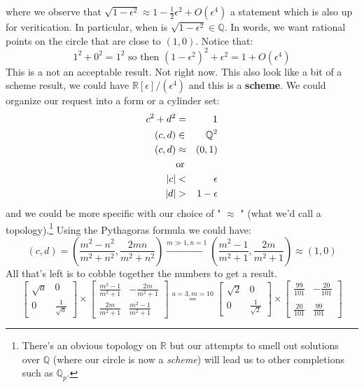 \documentclass[12pt]{article}
\begin{document}
where we observe that $\sqrt{1-\epsilon^2} \approx 1 - \frac{1}{2} \epsilon^2 + O(\epsilon^4)$ a statement which is also up for veritication.  In particular, when is $\sqrt{1 - \epsilon^2} \in \mathbb{Q}$.  In words, we want rational points on the circle that are close to $(1,0)$.  Notice that:
$$ 1^2 + 0^2 = 1^2 \text{ so then } (1-\epsilon^2)^2 + \epsilon^2 = 1 + O(\epsilon^4) $$
This is a not an acceptable result.  Not right now.  This also look like a bit of a scheme result, we could have $\mathbb{R}[\epsilon]/(\epsilon^4)$ and this is a \textbf{scheme}.  We could organize our request into a form or a cylinder set:
\begin{eqnarray*}
c^2 + d^2 &=& 1 \\
(c,d) &\in& \mathbb{Q}^2\\
(c,d) & \approx & (0,1) \\ \vspace{8pt}
&\text{or}& \\ \vspace{8pt}
|c| & < & \epsilon \\
|d| & > & 1 - \epsilon
\end{eqnarray*}
and we could be more specific with our choice of " $\approx$ " (what we'd call a topology).\footnote{There's an obvious topology on $\mathbb{R}$ but our attempts to smell out solutions over $\mathbb{Q}$ (where our circle is now a \textit{scheme}) will lead us to other completions such as $\mathbb{Q}_p$.}  Using the Pythagoras formula we could have:
$$ (c,d) = \left( \frac{m^2 - n^2}{m^2 + n^2}, \frac{2mn}{m^2 + n^2} \right) \stackrel{m \gg 1, n=1}{\longrightarrow} \left(  
\frac{m^2 - 1}{m^2 + 1}, \frac{2m}{m^2 + 1}\right)\approx (1,0) $$  
All that's left is to cobble together the numbers to get a result.  
$$ \left[ \begin{array}{cc} \sqrt{a} & 0 \\ 0 & \frac{1}{\sqrt{a}} \end{array} \right] 
\times
\left[ \begin{array}{rr} \frac{m^2 - 1}{m^2 + 1} & -\frac{2m}{m^2 + 1} \\ 
\frac{2m}{m^2 + 1} & \frac{m^2 - 1}{m^2 + 1}  \end{array} \right] \stackrel{a=3,m=10}{=}
 \left[ \begin{array}{cc} \sqrt{2} & 0 \\ 0 & \frac{1}{\sqrt{2}} \end{array} \right] 
\times
\left[ \begin{array}{rr} \frac{99}{101} & -\frac{20}{101} \\ \\
\frac{20}{101} & \frac{99}{101}  \end{array} \right]
$$
\end{document}
